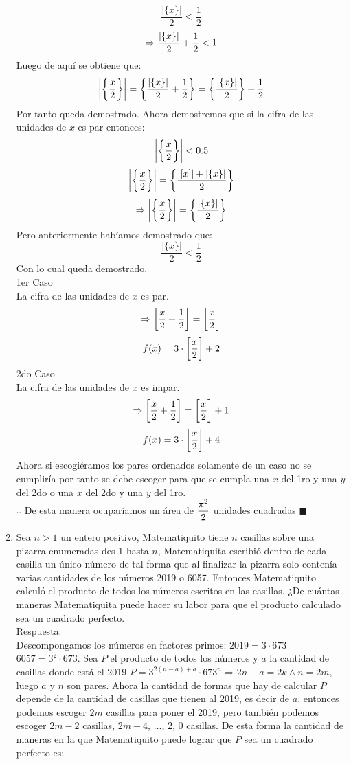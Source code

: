 \documentclass{book}
\begin{document}
\begin{enumerate}
          $$\frac{|\{x\}|}{2}<\frac{1}{2}$$
          $$\Rightarrow {|\{x\}|\over 2}+{1\over 2}<1$$
          Luego de aquí se obtiene que:
          $$\bigg|\bigg\{{x\over 2}\bigg\}\bigg|=\bigg\{\frac{|\{x\}|}{2}+{1\over 2}\bigg\}=\bigg\{\frac{|\{x\}|}{2}\bigg\}+{1\over 2}$$
          Por tanto queda demostrado. Ahora demostremos que si la cifra de las unidades de $x$ es par entonces:
          $$\bigg|\bigg\{{x\over 2}\bigg\}\bigg|<0.5$$
          $$\bigg|\bigg\{{x\over 2}\bigg\}\bigg|=\bigg\{\frac{|[x]|+|\{x\}|}{2}\bigg\}$$
          $$\Rightarrow \bigg|\bigg\{{x\over 2}\bigg\}\bigg|=\bigg\{{|\{x\}|\over 2}\bigg\}$$
          Pero anteriormente habíamos demostrado que:
          $$\frac{|\{x\}|}{2}<\frac{1}{2}$$
          Con lo cual queda demostrado.\\
          1er Caso \\
          La cifra de las unidades de $x$ es par.
          $$\Rightarrow\bigg[{x\over 2}+{1\over 2}\bigg]=\bigg[{x\over 2}\bigg]$$
          $$f(x)=3\cdot\bigg[{x\over 2}\bigg]+2$$
          2do Caso\\
          La cifra de las unidades de $x$ es impar.
          $$\Rightarrow\bigg[{x\over 2}+{1\over 2}\bigg]=\bigg[{x\over 2}\bigg]+1$$
          $$f(x)=3\cdot\bigg[{x\over 2}\bigg]+4$$
          Ahora si escogiéramos los pares ordenados solamente de un caso no se cumpliría por tanto se debe escoger para que se cumpla una $x$ del 1ro y una $y$ del 2do o una $x$ del 2do y una $y$ del 1ro. \\
          $\therefore$ De esta manera ocuparíamos un área de $\displaystyle{\pi^2\over 2}$ unidades cuadradas $\blacksquare$\\
    \item Sea $n>1$ un entero positivo, Matematiquito tiene $n$ casillas sobre una pizarra enumeradas des 1 hasta $n$, Matematiquita escribió dentro de cada casilla un único número de tal forma que al finalizar la pizarra solo contenía varias cantidades de los números 2019 o 6057. Entonces Matematiquito calculó el producto de todos los números escritos en las casillas. ¿De cuántas maneras Matematiquita puede hacer su labor para que el producto calculado sea un cuadrado perfecto.\\
          Respuesta:\\
          Descompongamos los números en factores primos: $2019=3\cdot 673$ $6057=3^2\cdot 673$. Sea $P$ el producto de todos los números y $a$ la cantidad de casillas donde está el 2019 $P=3^{2(n-a)+a}\cdot  673^{n}\Rightarrow 2n-a=2k \wedge n=2m$, luego $a$ y $n$ son pares. Ahora la cantidad de formas que hay de calcular $P$ depende de la cantidad de casillas que tienen al 2019, es decir de $a$, entonces podemos escoger $2m$ casillas para poner el 2019, pero también podemos escoger $2m-2$ casillas, $2m-4$, $\ldots$, 2, 0 casillas. De esta forma la cantidad de maneras en la que Matematiquito puede lograr que $P$ sea un cuadrado perfecto es:

\end{enumerate}
\end{document}
